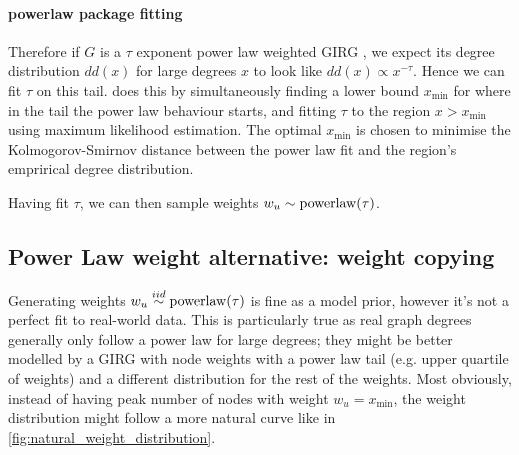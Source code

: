 \paragraph{powerlaw package fitting}
Therefore if $G$ is a $\tau$ exponent power law weighted GIRG , we expect its degree distribution $dd(x)$ for large degrees $x$ to look like $dd(x) \propto x^{-\tau}$. Hence we can fit $\tau$ on this tail. \PLP does this by simultaneously finding a lower bound $x_{\min}$ for where in the tail the power law behaviour starts, and fitting $\tau$ to the region $x > x_{\min}$ using maximum likelihood estimation. The optimal $x_{\min}$ is chosen to minimise the Kolmogorov-Smirnov distance between the power law fit and the region's emprirical degree distribution.

Having fit $\tau$, we can then sample weights $w_u \sim \operatorname{powerlaw}(\tau)$.


\subsection{Power Law weight alternative: weight copying}
Generating weights $w_u \stackrel{iid}{\sim} \operatorname{powerlaw}(\tau)$ is fine as a model prior, however it's not a perfect fit to real-world data. This is particularly true as real graph degrees generally only follow a power law for large degrees; they might be better modelled by a GIRG with node weights with a power law tail (e.g. upper quartile of weights) and a different distribution for the rest of the weights. Most obviously, instead of having peak number of nodes with weight $w_u = x_{\min}$, the weight distribution might follow a more natural curve like in \cref{fig:natural_weight_distribution}.


